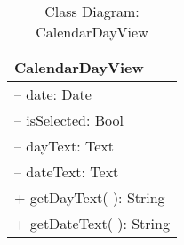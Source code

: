 \begin{table}[ht]
\centering
\caption{Class Diagram: CalendarDayView}

\hspace{1em}
\renewcommand{\arraystretch}{1.7}

\begin{tabular}{|l|}
\hline
\textbf{CalendarDayView} \\
\hline
– date: Date \\
– isSelected: Bool \\
– dayText: Text \\
– dateText: Text \\
\hdashline
+ getDayText( ): String \\
+ getDateText( ): String \\
\hline
\end{tabular}
\end{table}
